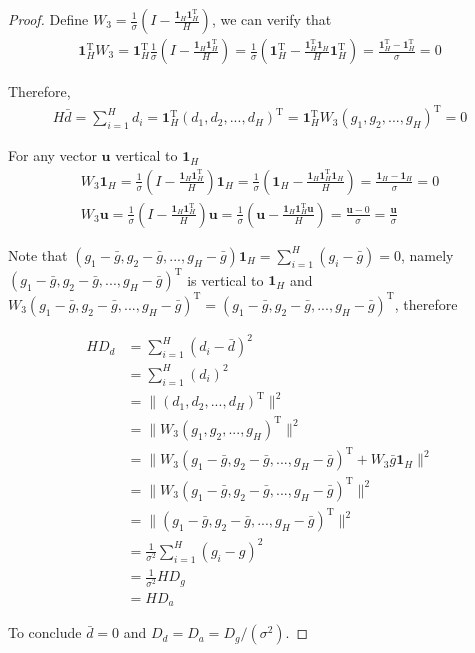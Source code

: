 \documentclass{article}
\newcommand*{\vect}[1]{\textbf{#1}}
\begin{document}
\begin{proof}
Define $W_3=\frac{1}{\sigma}(I-\frac{\vect{1}_H\vect{1}_H^\text{T}}{H})$, we can verify that
\begin{equation}\begin{aligned}
\vect{1}_H^\text{T}W_3=\vect{1}_H^\text{T}\frac{1}{\sigma}(I-\frac{\vect{1}_H\vect{1}_H^\text{T}}{H})=\frac{1}{\sigma}(\vect{1}_H^\text{T}-\frac{\vect{1}_H^\text{T}\vect{1}_H}{H}\vect{1}_H^\text{T})=\frac{\vect{1}_H^\text{T}-\vect{1}_H^\text{T}}{\sigma}=0
\end{aligned}\end{equation}

Therefore, 
\begin{equation}\begin{aligned}
H\bar d=\sum\limits_{i=1}^{H}d_i=\vect{1}_H^\text{T}(d_1, d_2,..., d_H)^\text{T}=\vect{1}_H^\text{T}W_3(g_1, g_2,..., g_H)^\text{T}=0
\end{aligned}\end{equation}

For any vector $\vect{u}$ vertical to $\vect{1}_H$
\begin{equation}\begin{aligned}
W_3\vect{1}_H=\frac{1}{\sigma}(I-\frac{\vect{1}_H\vect{1}_H^\text{T}}{H})\vect{1}_H=\frac{1}{\sigma}(\vect{1}_H-\frac{\vect{1}_H\vect{1}_H^\text{T}\vect{1}_H}{H})=\frac{\vect{1}_H-\vect{1}_H}{\sigma}=0\\
W_3\vect{u}=\frac{1}{\sigma}(I-\frac{\vect{1}_H\vect{1}_H^\text{T}}{H})\vect{u}=\frac{1}{\sigma}(\vect{u}-\frac{\vect{1}_H\vect{1}_H^\text{T}\vect{u}}{H})=\frac{\vect{u}-0}{\sigma}=\frac{\vect{u}}{\sigma}
\end{aligned}\end{equation}

Note that $(g_1-\bar g, g_2-\bar g,..., g_H-\bar g)\vect{1}_H=\sum\limits_{i=1}^H(g_i-\bar g)=0$, namely $(g_1-\bar g, g_2-\bar g,..., g_H-\bar g)^\text{T}$ is vertical to $\vect{1}_H$ and $W_3(g_1-\bar g, g_2-\bar g,..., g_H-\bar g)^\text{T}=(g_1-\bar g, g_2-\bar g,..., g_H-\bar g)^\text{T}$, therefore

\begin{equation}\begin{aligned}
HD_d&=\sum\limits_{i=1}^{H}(d_i-\bar d)^2\\
&=\sum\limits_{i=1}^{H}(d_i)^2\\
&=\|(d_1, d_2, ..., d_H)^\text{T}\|^2\\
&=\|W_3(g_1, g_2,..., g_H)^\text{T}\|^2\\
&=\|W_3(g_1-\bar g, g_2-\bar g,..., g_H-\bar g)^\text{T}+W_3\bar g\vect{1}_H\|^2\\
&=\|W_3(g_1-\bar g, g_2-\bar g,..., g_H-\bar g)^\text{T}\|^2\\
&=\|(g_1-\bar g, g_2-\bar g,..., g_H-\bar g)^\text{T}\|^2\\
&=\frac{1}{\sigma^2}\sum\limits_{i=1}^H(g_i-g)^2 \\
&=\frac{1}{\sigma^2}HD_g\\
&=HD_a
\end{aligned}\end{equation}

To conclude $\bar d=0$ and $D_d=D_a=D_g/(\sigma^2)$.

\end{proof}
\end{document}
